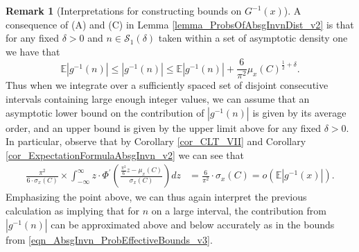 \documentclass[11pt,reqno,a4letter]{article}
\numberwithin{figure}{section}
\numberwithin{table}{section}
\theoremstyle{plain}
\numberwithin{theorem}{section}
\theoremstyle{definition}
\newtheorem{remark}[theorem]{Remark}
\begin{document}
\begin{remark}[Interpretations for constructing bounds on $G^{-1}(x)$] 
A consequence of (A) and (C) in Lemma \ref{lemma_ProbsOfAbsgInvnDist_v2} 
is that for any fixed $\delta > 0$ and $n \in \mathcal{S}_1(\delta)$ 
taken within a set of asymptotic density one we have that 
\begin{equation} 
\label{eqn_AbsgInvn_ProbEffectiveBounds_v3} 
\mathbb{E}|g^{-1}(n)| \leq |g^{-1}(n)| \leq \mathbb{E}|g^{-1}(n)| + \frac{6}{\pi^2} 
     \mu_x(C)^{\frac{1}{2} + \delta}. 
\end{equation} 
Thus when we integrate over a sufficiently spaced set of disjoint consecutive intervals 
containing large enough integer values, 
we can assume that an asymptotic lower bound on the 
contribution of $|g^{-1}(n)|$ is given by its average 
order, and an upper bound is given by the upper limit above for any fixed $\delta > 0$. 
In particular, observe that by 
Corollary \ref{cor_CLT_VII} and 
Corollary \ref{cor_ExpectationFormulaAbsgInvn_v2} 
we can see that 
\begin{align*} 
\frac{\pi^2}{6 \cdot \sigma_x(C)} \times \int_{-\infty}^{\infty} z \cdot 
     \Phi^{\prime}\left(\frac{\frac{\pi^2}{6} z - \mu_x(C)}{\sigma_x(C)}\right) dz & = 
     \frac{6}{\pi^2} \cdot \sigma_x(C) = o\left(\mathbb{E}|g^{-1}(x)|\right). 
\end{align*} 
Emphasizing the point above, 
we can thus again interpret the previous calculation as implying that for $n$ on a large 
interval, the contribution from $|g^{-1}(n)|$ can be approximated above and below 
accurately as in the bounds from \eqref{eqn_AbsgInvn_ProbEffectiveBounds_v3}. 
\end{remark} 
\end{document}
